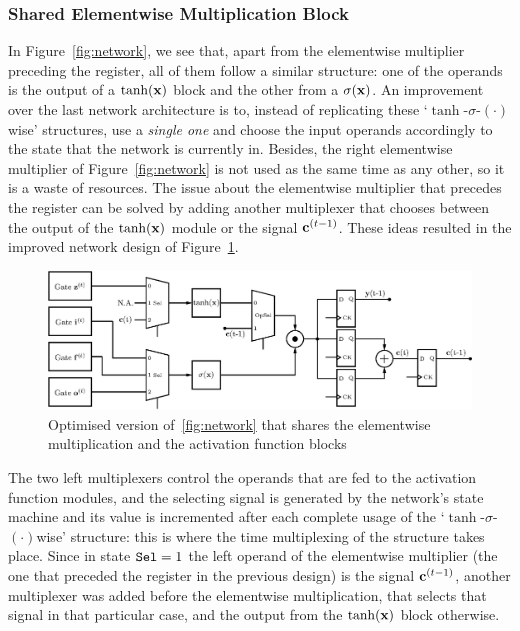 \subsubsection{Shared Elementwise Multiplication Block}\label{sec:struct-shared}
In Figure~\ref{fig:network}, we see that, apart from the elementwise multiplier preceding the register, all of them follow a similar structure: one of the
operands is the output of a $\tanh(\mathbf{x})$ block and the other from a $\sigma(\mathbf{x})$. An improvement over the last network architecture is to, instead of
replicating these `$\tanh$-$\sigma$-$(\cdot)$wise' structures, use a \emph{single one} and choose the input operands accordingly to the state that the network is
currently in. Besides, the right elementwise multiplier of Figure~\ref{fig:network} is not used as the same time as any other, so it is a waste of resources.
The issue about the elementwise multiplier that precedes the register can be solved by adding another multiplexer that chooses between the output of the $\tanh(\mathbf{x})$
module or the signal $\mathbf{c}^{(t-1)}$. These ideas resulted in the improved network design of Figure~\ref{fig:network-opt}.

\begin{figure}
    \centering
    \includegraphics[width=0.9\linewidth]{figures/network-opt.eps}
    \caption[Optimised version of~\ref{fig:network} that shares the elementwise multiplication and the activation function blocks]{Optimised version of~\ref{fig:network} that shares the elementwise multiplication and the activation function blocks}
    \label{fig:network-opt}
\end{figure}
The two left multiplexers control the operands that are fed to the activation function modules, and the selecting signal is generated by the network's state machine and its value
is incremented after each complete usage of the `$\tanh$-$\sigma$-$(\cdot)$wise' structure: this is where the time multiplexing of the structure takes place.
Since in state $\verb+Sel+=1$ the left operand of the elementwise multiplier (the one that preceded the register in the previous design) is the signal $\mathbf{c}^{(t-1)}$,
another multiplexer was added before the elementwise multiplication, that selects that signal in that particular case, and the output from the $\tanh(\mathbf{x})$ block otherwise.

